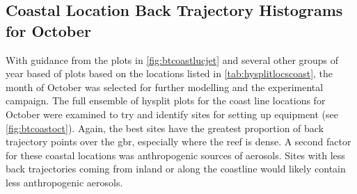 \subsection{Coastal Location Back Trajectory Histograms for October}
\label{subsec:coastoctbt}

With guidance from the plots in \cref{fig:btcoastlucjet} and several other groups of year based of plots based on the locations listed in \cref{tab:hysplitlocscoast}, the month of October was selected for further modelling and the experimental campaign. The full ensemble of \gls{hysplit} plots for the coast line locations for October were examined to try and identify sites for setting up equipment (see \cref{fig:btcoastoct}). Again, the best sites have the greatest proportion of back trajectory points over the \gls{gbr}, especially where the reef is dense. A second factor for these coastal locations was anthropogenic sources of aerosols. Sites with less back trajectories coming from inland or along the coastline would likely contain less anthropogenic aerosols. 

